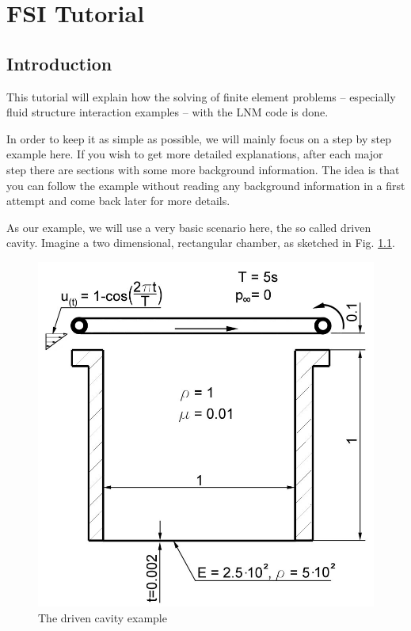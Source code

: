 \chapter{FSI Tutorial}
\label{tut_fsi:chap}

\section{Introduction}

This tutorial will explain how the solving of finite element problems
-- especially fluid structure interaction examples -- with the LNM
code is done.

In order to keep it as simple as possible, we will mainly focus on
a step by step example here. If you wish to get more detailed explanations,
after each major step there are sections with some more background
information. The idea is that you can follow the example without
reading any background information in a first attempt and come back
later for more details.

As our example, we will use a very basic scenario here, the so called
driven cavity. Imagine a two dimensional, rectangular chamber, as
sketched in Fig. \ref{tut_fsi:1.1}.


\begin{figure}[h]
\hfil\includegraphics[scale=0.2]{Bilder/Angabeskizze}

\caption{\label{tut_fsi:1.1} The driven cavity example}
\end{figure}


